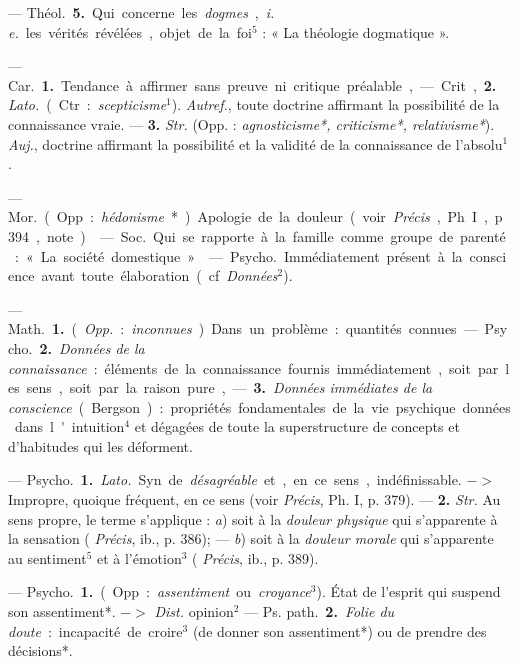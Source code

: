 \begin{itemize}[leftmargin=1cm, label=, itemsep=1pt]
— \si{Théol.} {\bf 5.} Qui concerne les
{\it dogmes}, {\it i. e.} les vérités révélées,
objet de la foi$^5$ : « La théologie dogmatique ».

 — \si{Car.} {\bf 1.} Tendance à
affirmer sans preuve ni critique
préalable,

— Crit, {\bf 2.} {\it Lato.} (Ctr. : {\it scepticisme}$^1$). {\it Autref.}, toute doctrine affirmant la possibilité de la connaissance vraie. — {\bf 3.} {\it Str.} (Opp. : {\it agnosticisme*, criticisme*, relativisme*}).
{\it Auj.}, doctrine affirmant la possibilité et la validité
de la connaissance de l’absolu$^1$.

 — \si{Mor.} (Opp. : {\it hédonisme}*).
Apologie de la douleur (voir  {\it Précis},
Ph. I, p. 394, note).

 — \si{Soc.} Qui se rapporte à
la famille comme groupe de parenté :
« La société domestique ».

 — \si{Psycho.} Immédiatement
présent à la conscience avant toute
élaboration (cf. {\it Données}$^2$).

 — \si{Math.} {\bf 1.} ({\it Opp.} : {\it inconnues}).
Dans un problème : quantités connues.

— \si{Psycho.} {\bf 2.} {\it Données de la connaissance} :
éléments de la connaissance fournis immédiatement, soit
par les sens, soit par la raison pure,
— {\bf 3.} {\it Données immédiates de la conscience} (Bergson) :
propriétés fondamentales de la vie psychique données dans l'intuition$^4$
et dégagées de toute la superstructure de concepts
et d’habitudes qui les déforment.

 — \si{Psycho.} {\bf 1.} {\it Lato.} Syn. de
{\it désagréable} et, en ce sens, indéfinissable. $->$ Impropre, quoique fréquent, en ce sens (voir  {\it Précis}, Ph. I,
p. 379). — {\bf 2.} {\it Str.} Au sens propre,
le terme s’applique : {\it a}) soit à la {\it douleur physique} qui s'apparente à la
sensation ( {\it Précis}, ib., p. 386); —
{\it b}) soit à la {\it douleur morale} qui s’apparente au sentiment$^5$ et à l’émotion$^3$
( {\it Précis}, ib., p. 389).

 — \si{Psycho.} {\bf 1.} (Opp. :
{\it assentiment} ou {\it croyance}$^3$). État de l'esprit
qui suspend son assentiment*.
$->$ {\it Dist.} opinion$^2$ — \si{Ps. path.}
 {\bf 2.} {\it Folie du doute} : incapacité de
croire$^3$ (de donner son assentiment*)
ou de prendre des décisions*.


\end{itemize}
